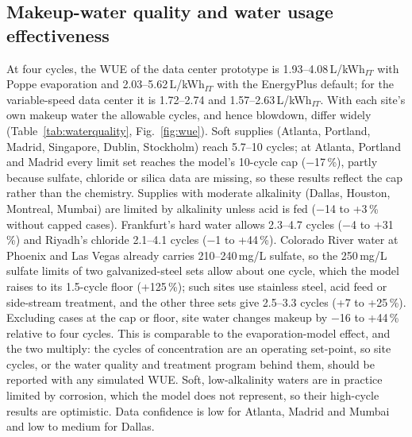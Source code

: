 \documentclass[preprint,12pt]{elsarticle}
\begin{document}
\subsection{Makeup-water quality and water usage effectiveness}\label{sec:wue}
At four cycles, the WUE of the data center prototype is 1.93--4.08\,L/kWh$_{IT}$ with Poppe evaporation and
2.03--5.62\,L/kWh$_{IT}$ with the EnergyPlus default; for the variable-speed data center it is 1.72--2.74 and
1.57--2.63\,L/kWh$_{IT}$. With each site's own makeup water the allowable cycles, and hence blowdown, differ widely
(Table~\ref{tab:waterquality}, Fig.~\ref{fig:wue}). Soft supplies (Atlanta, Portland, Madrid, Singapore, Dublin, Stockholm)
reach 5.7--10 cycles; at Atlanta, Portland and Madrid every limit set reaches the model's 10-cycle cap ($-$17\,\%), partly
because sulfate, chloride or silica data are missing, so these results reflect the cap rather than the chemistry.
Supplies with moderate alkalinity (Dallas, Houston, Montreal, Mumbai) are limited by alkalinity unless acid is fed
($-$14 to +3\,\% without capped cases). Frankfurt's hard water allows 2.3--4.7 cycles ($-$4 to +31\,\%) and Riyadh's
chloride 2.1--4.1 cycles ($-$1 to +44\,\%). Colorado River water at Phoenix and Las Vegas already carries 210--240\,mg/L
sulfate, so the 250\,mg/L sulfate limits of two galvanized-steel sets allow about one cycle, which the model raises to its
1.5-cycle floor (+125\,\%); such sites use stainless steel, acid feed or side-stream treatment, and the other three sets give
2.5--3.3 cycles (+7 to +25\,\%). Excluding cases at the cap or floor, site water changes makeup by $-$16 to +44\,\% relative
to four cycles. This is comparable to the evaporation-model effect, and the two multiply: the cycles of concentration are
an operating set-point, so site cycles, or the water quality and treatment program behind them, should be reported with
any simulated WUE. Soft, low-alkalinity waters are in practice limited by corrosion, which the model does not represent,
so their high-cycle results are optimistic. Data confidence is low for Atlanta, Madrid and Mumbai and low to medium for
Dallas.

\begin{table}[t]\centering\scriptsize
\caption{Data center prototype: site makeup water and cycles of concentration. Data: confidence of the water-quality data
(H high, M medium, L low); $^\dagger$sulfate, chloride or silica missing (treated as non-limiting). $N_{c,\mathrm{eff}}$:
effective annual cycles $E/(B+D_r)+1$, range over the five limit sets. $\Delta$WUE: Poppe makeup per IT energy relative to
four cycles, over all sets ($^c$lower end at the 10-cycle cap; $^f$upper end at the 1.5-cycle floor) and over the sets at
neither bound (``--'': none). ``min.'': raised to the 1.5-cycle minimum.}\label{tab:waterquality}
\resizebox{\linewidth}{!}{}
\end{table}
\end{document}
